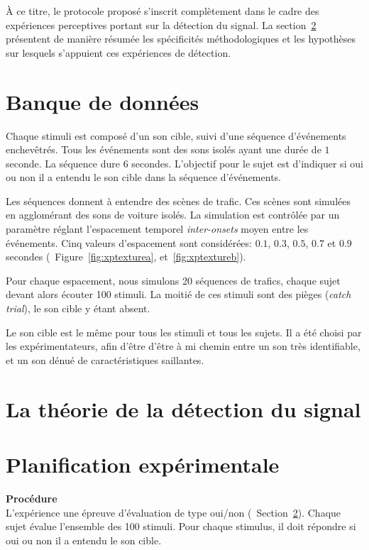 À ce titre, le protocole proposé s'inscrit complètement dans le cadre des expériences perceptives portant sur la détection du signal. La section~\ref{app:sdt} présentent de manière résumée les spécificités méthodologiques et les hypothèses sur lesquels s'appuient ces expériences de détection.

\section{Banque de données}

Chaque stimuli est composé d'un son cible, suivi d'une séquence d'événements enchevêtrés. Tous les événements sont des sons isolés ayant une durée de $1$ seconde. La séquence dure 6 secondes. L'objectif pour le sujet est d'indiquer si oui ou non il a entendu le son cible dans la séquence d’événements. 

Les séquences donnent à entendre des scènes de trafic. Ces scènes sont simulées en agglomérant des sons de voiture isolés. La simulation est contrôlée par un paramètre réglant l'espacement temporel \emph{inter-onsets} moyen entre les événements. Cinq valeurs d'espacement sont considérées: $0.1$, $0.3$, $0.5$, $0.7$ et $0.9$ secondes (\cf~Figure~\ref{fig:xptexturea}, et~\ref{fig:xptextureb}). 

Pour chaque espacement, nous simulons 20 séquences de trafics, chaque sujet devant alors écouter 100 stimuli. La moitié de ces stimuli sont des pièges (\emph{catch trial}), le son cible y étant absent.

Le son cible est le même pour tous les stimuli et tous les sujets. Il a été choisi par les expérimentateurs, afin d'être d'être à mi chemin entre un son très identifiable, et un son dénué de caractéristiques saillantes.

\section{La théorie de la détection du signal}
\label{app:sdt}

\section{Planification expérimentale}

\textbf{Procédure} \\ 

L'expérience une épreuve d'évaluation de type oui/non (\cf~Section~\ref{app:sdt}). Chaque sujet évalue l'ensemble des 100 stimuli. Pour chaque stimulus, il doit répondre si oui ou non il a entendu le son cible.

